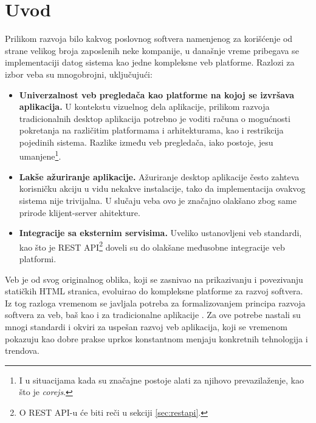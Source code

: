 \documentclass[12pt,oneside]{memoir}
\begin{document}
\frontmatter
\naslovna
\komisija
\apstrakt
\tableofcontents*

\mainmatter

\chapter{Uvod}

Prilikom razvoja bilo kakvog poslovnog softvera namenjenog za korišćenje od strane velikog broja zaposlenih neke kompanije, u današnje vreme pribegava se implementaciji datog sistema kao jedne kompleksne veb platforme. Razlozi za izbor veba su mnogobrojni, uključujući:

\begin{itemize}
    \item \textbf{Univerzalnost veb pregledača kao platforme na kojoj se izvršava aplikacija.} U kontekstu vizuelnog dela aplikacije, prilikom razvoja tradicionalnih desktop aplikacija potrebno je voditi računa o mogućnosti pokretanja na različitim platformama i arhitekturama, kao i restrikcija pojedinih sistema. Razlike između veb pregledača, iako postoje, jesu umanjene\footnote{I u situacijama kada su značajne postoje alati za njihovo prevazilaženje, kao što je \textit{corejs}.}. 
    \item \textbf{Lakše ažuriranje aplikacije.} Ažuriranje desktop aplikacije često zahteva korisničku akciju u vidu nekakve instalacije, tako da implementacija ovakvog sistema nije trivijalna. U slučaju veba ovo je značajno olakšano zbog same prirode klijent-server ahitekture.
    \item \textbf{Integracije sa eksternim servisima.} Uveliko ustanovljeni veb standardi, kao što je REST API\footnote{O REST API-u će biti reči u sekciji \ref{sec:restapi}.} doveli su do olakšane međusobne integracije veb platformi.
\end{itemize}

Veb je od svog originalnog oblika, koji se zasnivao na prikazivanju i povezivanju statičkih HTML stranica, evoluirao do kompleksne platforme za razvoj softvera. Iz tog razloga vremenom se javljala potreba za formalizovanjem principa razvoja softvera za veb, baš kao i za tradicionalne aplikacije \cite{web_evolution}. Za ove potrebe nastali su mnogi standardi i okviri za uspešan razvoj veb aplikacija, koji se vremenom pokazuju kao dobre prakse uprkos konstantnom menjaju konkretnih tehnologija i trendova.
\end{document}
